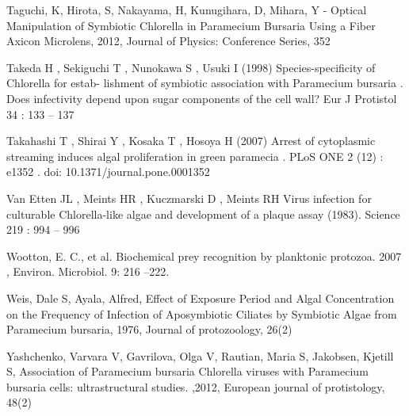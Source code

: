  
\noindent Taguchi, K, Hirota, S, Nakayama, H, Kunugihara, D, Mihara, Y - Optical Manipulation of Symbiotic Chlorella in Paramecium Bursaria Using a Fiber Axicon Microlens, 2012, Journal of Physics: Conference Series, 352

 
\noindent Takeda H , Sekiguchi T , Nunokawa S , Usuki I (1998) Species-specificity of Chlorella for estab- lishment of symbiotic association with Paramecium bursaria . Does infectivity depend upon sugar components of the cell wall? Eur J Protistol 34 : 133 – 137

 
\noindent Takahashi T , Shirai Y , Kosaka T , Hosoya H (2007) Arrest of cytoplasmic streaming induces algal proliferation in green paramecia . PLoS ONE 2 (12) : e1352 . doi: 10.1371/journal.pone.0001352

 
\noindent{} Van Etten JL , Meints HR , Kuczmarski D , Meints RH  Virus infection for culturable Chlorella-like algae and development of a plaque assay (1983). Science 219 : 994 – 996

 
\noindent Wootton, E. C., et al. Biochemical prey recognition by planktonic protozoa. 2007 , Environ. Microbiol. 9: 216 –222.

 
\noindent Weis, Dale S, Ayala, Alfred, Effect of Exposure Period and Algal Concentration on the Frequency of Infection of Aposymbiotic Ciliates by Symbiotic Algae from Paramecium bursaria, 1976,  Journal of protozoology, 26(2)

 
\noindent Yashchenko, Varvara V, Gavrilova, Olga V,  Rautian, Maria S, Jakobsen, Kjetill S, Association of Paramecium bursaria Chlorella viruses with Paramecium bursaria cells: ultrastructural studies. ,2012,  European journal of protistology, 48(2)




